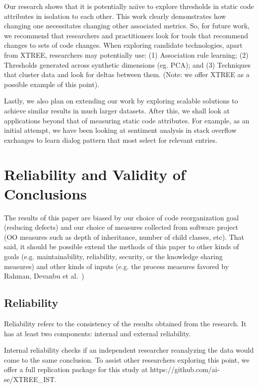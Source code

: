 \documentclass[twocolumn,5p]{elsarticle}
\theoremstyle{break}
\begin{document}
{		Our research shows that it is potentially na\"{\i}ve to explore 
		thresholds in static code attributes in isolation to each other. 
		This work clearly demonstrates how changing one necessitates changing 
		other associated metrics. So, for future work, we recommend that 
		researchers and practitioners look for tools that recommend changes to 
		sets 
		of code changes. When exploring candidate technologies, apart from 
		XTREE, 
		researchers may potentially use: (1) Association rule learning; (2) 
		Thresholds generated across synthetic dimensions (eg. PCA); and (3) 
		Techniques that cluster data and look for deltas between them. (Note: 
		we 
		offer XTREE as a possible example of this point).
		
		Lastly, we also
		plan on extending our work by exploring scalable 
		solutions 
		to achieve similar results in much larger datasets. After this, we 
		shall 
		look at applications beyond that of measuring static 
		code attributes. For example, as an initial attempt, we have been 
		looking 
		at sentiment analysis in stack overflow exchanges to learn dialog 
		pattern 
		that most select for relevant entries.}
		
	
	\section{Reliability and Validity of Conclusions}
	\label{sect:valid}
	
	
	
	The results of this paper are biased by our choice of code reorganization
	goal (reducing defects) and our choice of measures collected from software
	project (OO measures such as depth of inheritance, number of child classes,
	etc). That said, it should be possible extend the methods of this paper to 
	other
	kinds of goals (e.g. maintainability, reliability, security, or the 
	knowledge sharing
	measures) and other kinds of
	inputs (e.g. the process measures favored by Rahman,
	Devanbu et al.~\cite{Rahman2013})
	
	\subsection{Reliability}
	Reliability refers to the consistency of the results obtained
	from the research. It has at least two components: internal
	and external reliability.
	
	Internal reliability checks if an independent researcher
	reanalyzing the data would come to the same conclusion.
	To assist other researchers exploring this point, we offer a full 
	replication package for this study at
	https://github.com/ai-se/XTREE\_IST.
	
\end{document}

